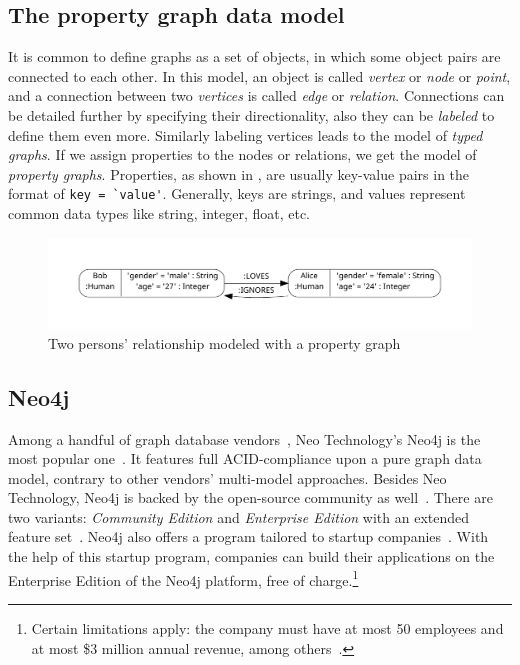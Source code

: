 \subsection{The property graph data model}

It is common to define graphs as a set of objects, in which some object pairs are connected to each other. In this model, an object is called \emph{vertex} or \emph{node} or \emph{point}, and a connection between two \emph{vertices} is called \emph{edge} or \emph{relation}. Connections can be detailed further by specifying their directionality, also they can be \emph{labeled} to define them even more. Similarly labeling vertices leads to the model of \emph{typed graphs}. If we assign properties to the nodes or relations, we get the model of \emph{property graphs}. Properties, as shown in , are usually key-value pairs in the format of \lstinline{key = `value'}. Generally, keys are strings, and values represent common data types like string, integer, float, etc.

\begin{figure}[!htb]
    \centering
    \includegraphics[width=\textwidth, trim=12mm 12mm 12mm 12mm,clip]{figures/property-graph.pdf}
    \caption{Two persons' relationship modeled with a property graph}
    \label{fig:property-graph}
\end{figure}

\subsection{Neo4j}
\label{subsection:preliminaryneo4j}

Among a handful of graph database vendors~\cite{graph-dbs}, Neo Technology's Neo4j is the most popular one~\cite{graph-dbs-raking}. It features full ACID-compliance upon a pure graph data model, contrary to other vendors' multi-model approaches. Besides Neo Technology, Neo4j is backed by the open-source community as well~\cite{neo4j-github}. There are two variants: \emph{Community Edition} and \emph{Enterprise Edition} with an extended feature set~\cite{neo4j-licensing}. Neo4j also offers a program tailored to startup companies~\cite{neo4j-startup-program}. With the help of this startup program, companies can build their applications on the Enterprise Edition of the Neo4j platform, free of charge.\footnote{Certain limitations apply: the company must have at most 50 employees and at most \$3 million annual revenue, among others~\cite{neo4j-startup-program}.}

